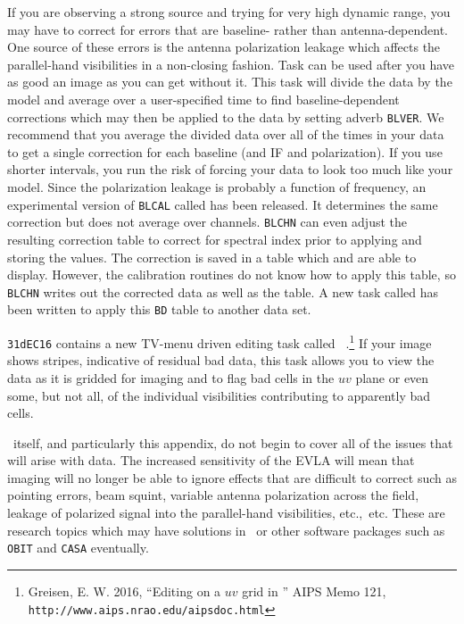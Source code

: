 If you are observing a strong source and trying for very high dynamic
range, you may have to correct for errors that are baseline- rather
than antenna-dependent.  One source of these errors is the antenna
polarization leakage which affects the parallel-hand visibilities in a
non-closing fashion.  Task {\tt {}} can be used after you
have as good an image as you can get without it.  This task will
divide the data by the model and average over a user-specified time to
find baseline-dependent corrections which may then be applied to the
data by setting adverb {\tt BLVER}\@.  We recommend that you average
the divided data over all of the times in your data to get a single
correction for each baseline (and IF and polarization).  If you use
shorter intervals, you run the risk of forcing your data to look too
much like your model.  Since the polarization leakage is probably a
function of frequency, an experimental version of {\tt BLCAL} called
{\tt {}} has been released.  It determines the same
correction but does not average over channels.  {\tt BLCHN} can even
adjust the resulting correction table to correct for spectral index
prior to applying and storing the values.  The correction is saved in
a table which {\tt {}} and {\tt {}} are able to
display.  However, the calibration routines do not know how to apply
this table, so {\tt BLCHN} writes out the corrected data as well as
the table.  A new task called {\tt {}} has been written to
apply this {\tt BD} table to another data set.

{\tt 31dEC16} contains a new TV-menu driven editing task called {\tt
{}}\@.\footnote{Greisen, E. W. 2016, ``Editing on a $uv$
grid in \AIPS'' AIPS Memo 121, {\tt
http://www.aips.nrao.edu/aipsdoc.html}}  If your image shows stripes,
indicative of residual bad data, this task allows you to view the data
as it is gridded for imaging and to flag bad cells in the $uv$ plane
or even some, but not all, of the individual visibilities contributing
to apparently bad cells.



\AIPS\ itself, and particularly this appendix, do not begin to cover
all of the issues that will arise with  data.  The
increased sensitivity of the EVLA will mean that imaging will no
longer be able to ignore effects that are difficult to correct such as
pointing errors, beam squint, variable antenna polarization across the
field, leakage of polarized signal into the parallel-hand
visibilities, etc.,~etc.  These are research topics which may have
solutions in \AIPS\ or other software packages such as {\tt OBIT} and
{\tt CASA} eventually.


